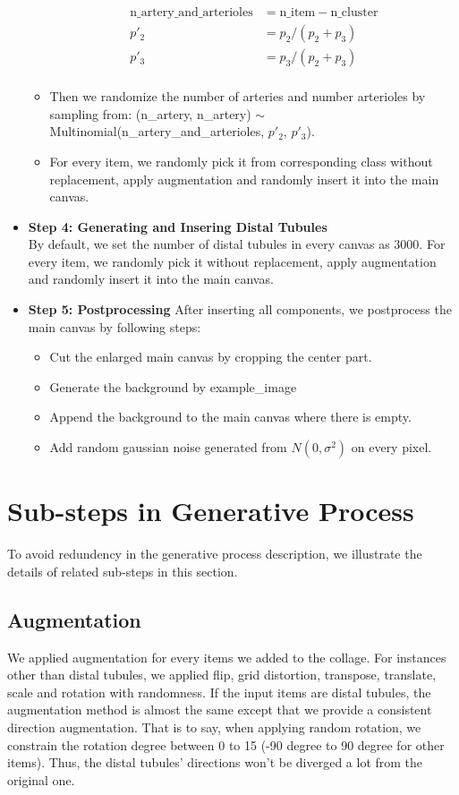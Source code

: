 \documentclass{article}
\begin{document}
\begin{itemize}
\begin{itemize}
\begin{align*}
		\text{n\_artery\_and\_arterioles}  &= \text{n\_item} - \text{n\_cluster}\\
		p'_2&= p_2 / (p_2+p_3)\\
		p'_3&= p_3 / (p_2+p_3)\\
		\end{align*}	
		\item 	Then we randomize the number of arteries and number arterioles by sampling from: 
		(n\_artery, n\_artery) $\sim$ Multinomial(n\_artery\_and\_arterioles, $p'_2$, $p'_3$).
		\item For every item, we randomly pick it from corresponding class without replacement, apply augmentation and randomly insert it into the main canvas.
	\end{itemize}
\item \textbf{Step 4: Generating and Insering Distal Tubules}\\	
By default, we set the number of distal tubules in every canvas as 3000. For every item, we randomly pick it without replacement, apply augmentation and randomly insert it into the main canvas.
\item \textbf{Step 5: Postprocessing}	
After inserting all components, we postprocess the main canvas by following steps:
\begin{itemize}
	\item Cut the enlarged main canvas by cropping the center part.
	\item Generate the background by example\_image
	\item Append the background to the main canvas where there is empty.
	\item Add random gaussian noise generated from $N(0, \sigma^2)$ on every pixel.
\end{itemize}
\end{itemize}


\section{Sub-steps in Generative Process}
To avoid redundency in the generative process description, we illustrate the details of related sub-steps in this section. 
\subsection{Augmentation}
We applied augmentation for every items we added to the collage. For instances other than distal tubules, we applied flip, grid distortion, transpose, translate, scale and rotation with randomness. If the input items are distal tubules, the augmentation method is almost the same except that we provide a consistent direction augmentation. That is to say, when applying random rotation, we constrain the  rotation degree between 0  to 15 (-90 degree to 90 degree for other items). Thus, the distal tubules' directions won't be diverged a lot from the original one.  
\end{document}
